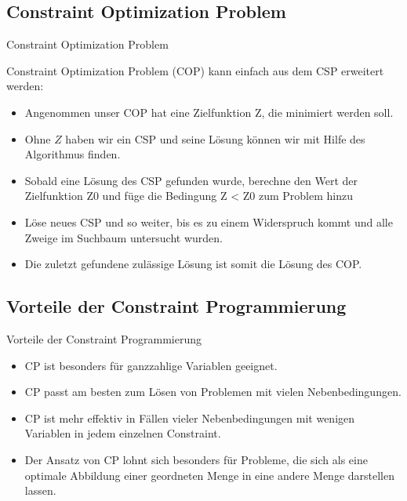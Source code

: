 \documentclass[hyperref={pdfpagelabels=false}]{beamer}
\begin{document}
\subsection{Constraint Optimization Problem}
\begin{frame}{Constraint Optimization Problem}

	{\color{darkred} Constraint Optimization Problem} ({\color{darkred}COP}) kann einfach aus dem CSP erweitert werden:
	\begin{itemize}
	\item Angenommen unser COP hat eine Zielfunktion Z, die minimiert werden soll. 
	
	\item Ohne $Z$ haben wir ein CSP und seine Lösung können wir
	mit Hilfe des Algorithmus finden.
	
	\pause
	
	\item Sobald eine Lösung des CSP
	gefunden wurde, berechne den Wert der Zielfunktion Z0 und füge die Bedingung Z < Z0 zum Problem hinzu 
	
	\item Löse neues CSP und so weiter, bis es zu einem Widerspruch kommt und alle Zweige
	im Suchbaum untersucht wurden.
	\pause
	\item Die zuletzt gefundene zulässige Lösung ist somit die Lösung des COP.
	\end{itemize}
\end{frame}
\subsection{Vorteile der Constraint Programmierung}

\begin{frame}{Vorteile der Constraint Programmierung}
\begin{itemize} \itemsep0pt
	\item CP ist besonders für ganzzahlige Variablen geeignet.
	\item CP passt am besten zum Lösen von Problemen mit vielen Nebenbedingungen.
	\item CP ist mehr effektiv in Fällen vieler Nebenbedingungen mit wenigen Variablen in jedem einzelnen Constraint.
	\item Der Ansatz von CP lohnt sich besonders für Probleme, die sich als eine optimale Abbildung einer geordneten Menge in eine andere Menge darstellen lassen.
\end{itemize}
\end{frame}
\end{document}
